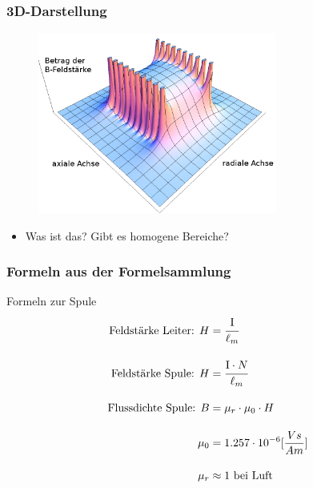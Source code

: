 \begin{frame}
  \frametitle{3D-Darstellung}
  \begin{center}
    \begin{figure}
      \includegraphics[width=0.7\textwidth,height=.6\textheight,keepaspectratio]{a08/3-D_HFeld.png}
    \end{figure}
    \begin{itemize}
      \item Was ist das? Gibt es homogene Bereiche?
    \end{itemize}
  \end{center}
\end{frame}

\begin{frame}
  \frametitle{Formeln aus der Formelsammlung}
  \begin{block}{Formeln zur Spule}
    \begin{align*}
      \text{Feldstärke Leiter: } H &= \cfrac{\mathrm{I}}{\ell_m} \\[1em]
      \text{Feldstärke Spule: } H &= \cfrac{\mathrm{I} \cdot N}{\ell_m} \\[1em]
      \text{Flussdichte Spule: } B &= \mu_r \cdot \mu_0 \cdot H \\[1em]
      \mu_0 &= 1.257 \cdot 10^{-6}[\frac{Vs}{Am}] \\[1em]
      \mu_r &\approx 1 \text{ bei Luft}
    \end{align*}
  \end{block}
\end{frame}

